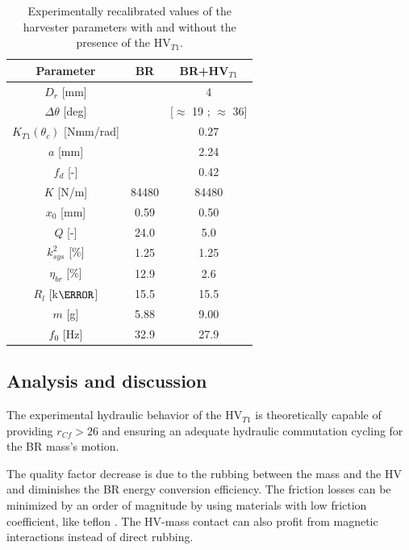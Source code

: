 \documentclass[3p,twocolumn,preprint]{elsarticle}
\begin{document}
\begin{table}[!htbp]
	\centering
		\begin{tabular}[t]{c|c|c}
\toprule
\multicolumn{1}{c}{\textbf{Parameter}}	&
\multicolumn{1}{c}{\textbf{BR}} 	& 
\multicolumn{1}{c}{\textbf{BR+HV$_{T1}$}}  \\
\midrule
$D_r$ [mm] 						& \cellcolor{ashgrey} 		& {4} 		\\ \hline
$\Delta\theta$ [deg] 			& \cellcolor{ashgrey} 		& {{[$\approx$ 19 ; $\approx$ 36]}} \\ \hline
$K_{T1}(\theta_c)$ [Nmm/rad]	& \cellcolor{ashgrey}  		&  0.27 		\\ \hline
$a$ [mm]         			    & \cellcolor{ashgrey}  		&  2.24		\\ \hline
$f_d$ [-] 						& \cellcolor{ashgrey}  		&  0.42  		\\ \hline
$K$ [N/m] 						&	84480			  	 	&  84480  			\\ \hline
$x_0$ [mm] 						& {0.59}					& {0.50}  	\\ \hline
$Q$	[-] 						& 		24.0		 		& 5.0     					\\ \hline
$k^2_{sys}$ [\%] 				& 		1.25		 		& {1.25}   	\\ \hline
$\eta_{br}$ [\%] 				& 		12.9		 		& 2.6   \\ \hline	
$R_l$ [k$\text{\ohm}$] 			&	{15.5}					& {15.5}   	\\ \hline		
$m$	[g]						    &	{5.88}					& 9.00   		\\ \hline	
$f_0$ [Hz]						&		32.9				& 27.9   					\\
\bottomrule	
	\end{tabular}
        \caption{Experimentally recalibrated values of the harvester parameters with and without the presence of the HV$_{T1}$.}
        \label{tab:parametres lacher tube}
\end{table}        
	\subsection{Analysis and discussion}
The experimental hydraulic behavior of the HV$_{T1}$ is theoretically capable of providing \mbox{$r_{Cf}>26$} and ensuring an adequate hydraulic commutation cycling for the BR mass's motion.

The quality factor decrease is due to the rubbing between the mass and the HV and diminishes the BR energy conversion efficiency. The friction losses can be minimized by an order of magnitude by using materials with low friction coefficient, like teflon \cite{Nosonovsky2013}. The HV-mass contact can also profit from magnetic interactions instead of direct rubbing.
\end{document}
